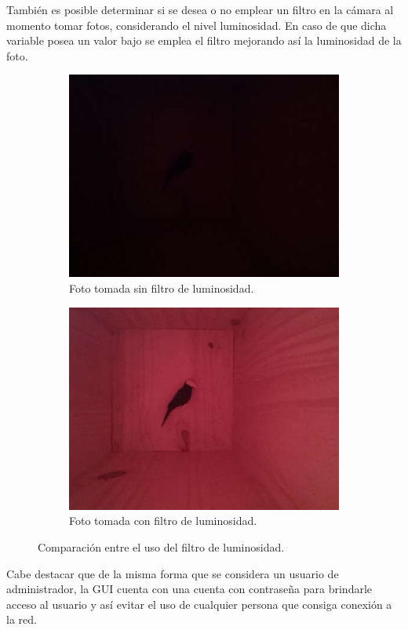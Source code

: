 También es posible determinar si se desea o no emplear un filtro en la cámara al momento tomar fotos, considerando el nivel luminosidad. En caso de que dicha variable posea un valor bajo se emplea el filtro mejorando así la luminosidad de la foto.
\begin{figure}[H]
\centering
    	\begin{subfigure}{0.49\textwidth}
        	\centering
        	\includegraphics[width=\linewidth]{ImagenesIngenieria de Detalle/ImagenDevSF_2}		
			\caption{Foto tomada sin filtro de luminosidad.}
			\label{fig:foto_camara_sf}
        \end{subfigure}\hfill
        \begin{subfigure}{0.49\textwidth}
        	\centering
        	\includegraphics[width=\linewidth]{ImagenesIngenieria de Detalle/ImagenDevCF_2}
        	\caption{Foto tomada con filtro de luminosidad.}
			\label{fig:foto_camara_cf}
        \end{subfigure}
	\caption{Comparación entre el uso del filtro de luminosidad.}
	\label{fig:foto_camara_filtro}
\end{figure}

Cabe destacar que de la misma forma que se considera un usuario de administrador, la GUI cuenta con una cuenta con contraseña para brindarle acceso al usuario y así evitar el uso de cualquier persona que consiga conexión a la red.